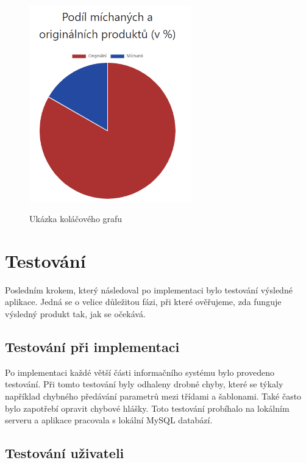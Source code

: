 \begin{figure}[H]
    \begin{center}
    \includegraphics[width=70mm]{obrazky-figures/stat2.png}
    
    \label{fig:img2}
    \caption{Ukázka koláčového grafu}
\end{center}
\end{figure}


\newpage

\chapter{Testování}
\label{test}

Posledním krokem, který následoval po implementaci bylo testování výsledné aplikace. Jedná se o velice důležitou fázi, při které ověřujeme, zda funguje výsledný produkt tak, jak se očekává.

\section{Testování při implementaci}

Po implementaci každé větší části informačního systému bylo provedeno testování. Při tomto testování byly odhaleny drobné chyby, které se týkaly například chybného předávání parametrů mezi třídami a šablonami. Také často bylo zapotřebí opravit chybové hlášky. Toto testování probíhalo na lokálním serveru a aplikace pracovala s lokální MySQL databází.

\section{Testování uživateli}

